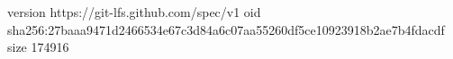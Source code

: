 version https://git-lfs.github.com/spec/v1
oid sha256:27baaa9471d2466534e67c3d84a6c07aa55260df5ce10923918b2ae7b4fdacdf
size 174916
